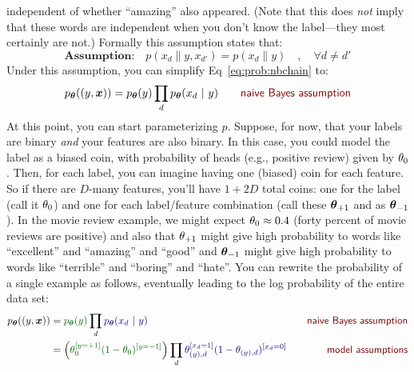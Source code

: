 independent of whether ``amazing'' also appeared.  (Note that this
does \emph{not} imply that these words are independent when you don't
know the label---they most certainly are not.)  Formally this
assumption states that:
%
\begin{equation} \label{eq:prob:nbassumption}
\textbf{Assumption:}\quad
  p(x_d \| y, x_{d'}) = p(x_d \| y) \quad,\quad \forall d \neq d'
\end{equation}
%
Under this assumption, you can simplify Eq~\eqref{eq:prob:nbchain} to:
%
\begin{align} \label{eq:prob:nb}
  \pth( (y, \vec x) )
&= \pth(y) \prod_d \pth(x_d \| y) 
\becauseof{naive Bayes assumption}
\end{align}
%
At this point, you can start parameterizing $p$.  Suppose, for now,
that your labels are binary \emph{and} your features are also binary.
In this case, you could model the label as a biased coin, with
probability of heads (e.g., positive review) given by $\theta_0$.  Then,
for each label, you can imagine having one (biased) coin for each
feature.  So if there are $D$-many features, you'll have $1+2D$ total
coins: one for the label (call it $\theta_0$) and one for each
label/feature combination (call these $\boldsymbol{\theta}_{+1}$ and as
$\boldsymbol{\theta}_{-1}$).  In the movie review example, we might expect $\theta_0
\approx 0.4$ (forty percent of movie reviews are positive) and also
that $\theta_{+1}$ might give high probability to words like
``excellent'' and ``amazing'' and ``good'' and $\boldsymbol{\theta}_{-1}$ might
give high probability to words like ``terrible'' and ``boring'' and
``hate''.  You can rewrite the probability of a single example as
follows, eventually leading to the log probability of the entire data
set:
%
\begin{align} \label{eq:prob:nbmult}
  \pth( (y, \vec x) )
&= \textcolor{darkergreen}{\pth(y)} \prod_d \textcolor{darkblue}{\pth(x_d \| y)}
\becauseof{naive Bayes assumption}\\
&= \left( \textcolor{darkergreen}{
      \th_0^{[y=+1]} (1-\th_0)^{[y=-1]}
    }\right)
  \prod_d
   \textcolor{darkblue}{
       \th_{(y),d}^{[x_d=1]}
       (1-\th_{(y),d})^{[x_d=0]}
       } \becauseof{model assumptions}
\end{align}


